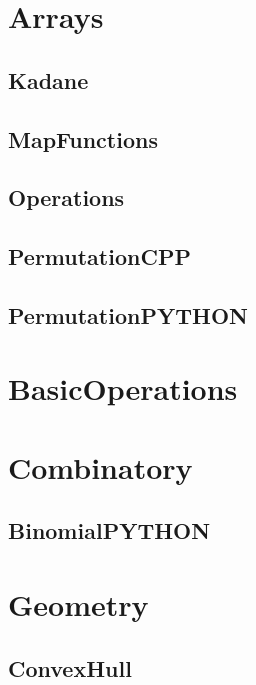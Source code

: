 \section{Arrays}
\subsection{ Kadane}
\raggedbottom
\hrulefill
\subsection{ MapFunctions}
\raggedbottom
\hrulefill
\subsection{ Operations}
\raggedbottom
\hrulefill
\subsection{ PermutationCPP}
\raggedbottom
\hrulefill
\subsection{ PermutationPYTHON}
\raggedbottom
\hrulefill

\section{BasicOperations}

\section{Combinatory}
\subsection{ BinomialPYTHON}
\raggedbottom
\hrulefill

\section{Geometry}
\subsection{ ConvexHull}
\raggedbottom
\hrulefill
